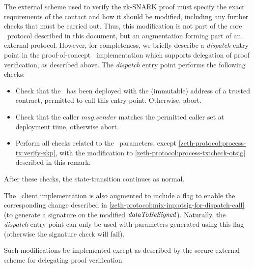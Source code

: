\begin{remark}
  The external scheme used to verify the zk-SNARK proof must specify the exact requirements of the contact and how it should be modified, including any further checks that must be carried out. Thus, this modification is not part of the core \zeth~protocol described in this document, but an augmentation forming part of an external protocol. However, for completeness, we briefly describe a \emph{dispatch} entry point in the proof-of-concept \mixer~implementation which supports delegation of proof verification, as described above. The \emph{dispatch} entry point performs the following checks:
  \begin{itemize}
  \item Check that the \mixer~has been deployed with the (immutable) address of a trusted contract, permitted to call this entry point. Otherwise, abort.
  \item Check that the caller $msg.sender$ matches the permitted caller set at deployment time, otherwise abort.
  \item Perform all checks related to the \mix~parameters, except \cref{zeth-protocol:process-tx:verify-zkp}, with the modification to \cref{zeth-protocol:process-tx:check-otsig} described in this remark.
  \end{itemize}
  After these checks, the state-transition continues as normal.

  The \zeth~client implementation is also augmented to include a flag to enable the corresponding change described in \cref{zeth-protocol:mix-inp:otsig-for-dispatch-call} (to generate a signature on the modified $\mathit{dataToBeSigned}$). Naturally, the \emph{dispatch} entry point can only be used with parameters generated using this flag (otherwise the signature check will fail).

  Such modifications \MUSTNOT{} be implemented except as described by the secure external scheme for delegating proof verification.
\end{remark}
